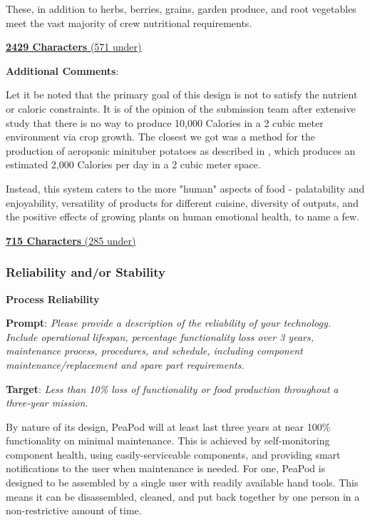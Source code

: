 \documentclass{../tex/report}
\begin{document}
These, in addition to herbs, berries, grains, garden produce, and root vegetables meet the vast majority of crew nutritional requirements.

\uline{\textbf{2429 Characters} (571 under)}

\vspace{0.5cm}

\textbf{Additional Comments}:

Let it be noted that the primary goal of this design is not to satisfy the nutrient or caloric constraints. It is of the opinion of the submission team after extensive study that there is no way to produce 10,000 Calories in a 2 cubic meter environment via crop growth. The closest we got was a method for the production of aeroponic minituber potatoes as described in \cite{minituber}, which produces an estimated 2,000 Calories per day in a 2 cubic meter space.

Instead, this system caters to the more "human" aspects of food - palatability and enjoyability, versatility of products for different cuisine, diversity of outputs, and the positive effects of growing plants on human emotional health, to name a few.

\uline{\textbf{715 Characters} (285 under)}

\newpage

\subsubsection{Reliability and/or Stability}

\textbf{Process Reliability}
\label{sec:reliability-process}

\textbf{Prompt}: \textit{Please provide a description of the reliability of your technology. Include operational lifespan, percentage functionality loss over 3 years, maintenance process, procedures, and schedule, including component maintenance/replacement and spare part requirements.}

\textbf{Target}: \textit{Less than 10\% loss of functionality or food production throughout a three-year mission.}


By nature of its design, PeaPod will at least last three years at near 100\% functionality on minimal maintenance. This is achieved by self-monitoring component health, using easily-serviceable components, and providing smart notifications to the user when maintenance is needed.
For one, PeaPod is designed to be assembled by a single user with readily available hand tools. This means it can be disassembled, cleaned, and put back together by one person in a non-restrictive amount of time.
\end{document}

